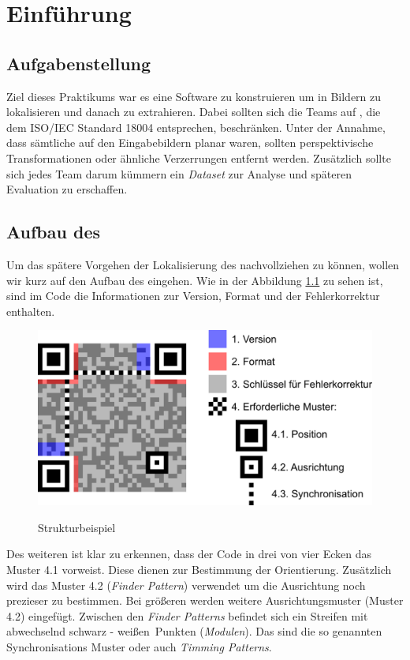 \chapter{Einführung}
\section{Aufgabenstellung}
Ziel dieses Praktikums war es eine Software zu konstruieren um \QRCodes in Bildern zu lokalisieren und danach zu extrahieren.
Dabei sollten sich die Teams auf \QRCodes, die dem ISO/IEC Standard 18004 entsprechen, beschränken.
Unter der Annahme, dass sämtliche \QRCodes auf den Eingabebildern planar waren, sollten perspektivische Transformationen oder ähnliche Verzerrungen entfernt werden.
Zusätzlich sollte sich jedes Team darum kümmern ein \emph{Dataset} zur Analyse und späteren Evaluation zu erschaffen.
 
\section{Aufbau des \QRCodes}
Um das spätere Vorgehen der Lokalisierung des \QRCodes nachvollziehen zu können, wollen wir kurz auf den Aufbau des \QRCodes eingehen.
Wie in der Abbildung \ref{fig:struktur-qrcode} zu sehen ist, sind im Code die Informationen zur Version, Format und der Fehlerkorrektur enthalten. 

\begin{figure}[h]
\centering
\includegraphics[scale=0.3]{images/QR_Code_Struktur_Beispiel.png}
\label{fig:struktur-qrcode}\caption{\QRCode Strukturbeispiel}
\end{figure}

Des weiteren ist klar zu erkennen, dass der Code in drei von vier Ecken das Muster 4.1 vorweist. Diese dienen zur Bestimmung der Orientierung. Zusätzlich wird das Muster 4.2 (\emph{Finder Pattern}) verwendet um die Ausrichtung noch prezieser zu bestimmen. Bei größeren \QRCodes werden weitere Ausrichtungsmuster (Muster 4.2) eingefügt. Zwischen den \emph{Finder Patterns} befindet sich ein Streifen mit abwechselnd \glqq schwarz - weißen\grqq\  Punkten (\emph{Modulen}). Das sind die so genannten Synchronisations Muster oder auch \emph{Timming Patterns}.

